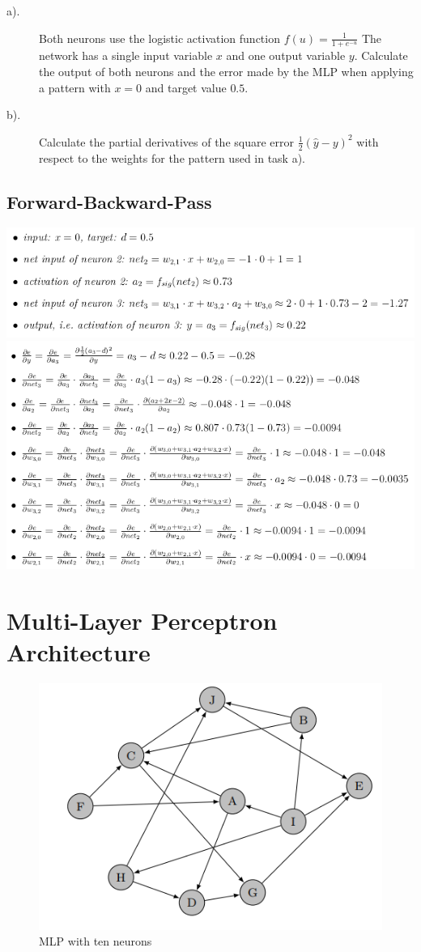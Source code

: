 \documentclass[12pt]{article}
\begin{document}
\begin{description}
	\item[a).]	Both neurons use the logistic activation function
	      $f(u)=\frac{1}{1+e^{-u}}$
	      The network has
	      a single input variable $x$ and one output variable $y$. Calculate the output of both
	      neurons and the error made by the MLP when applying a pattern with $x = 0$ and
	      target value $0.5$.
	\item[b).] Calculate the partial derivatives of the
	      square error $\frac{1}{2}(\hat{y} -y)^2$
	      with respect to the weights for the pattern used in task a).
\end{description}

\subsection{Forward-Backward-Pass}

{
	\centering
	\includegraphics[width=.9\textwidth]{fig/2018-04-02-14-48-39.png} \\
	\includegraphics[width=.9\textwidth]{fig/2018-04-02-14-49-31.png}
}

\newpage 
\section{Multi-Layer Perceptron Architecture}

\begin{figure}[!htbp]
	\centering
	\includegraphics[width=.55\textwidth]{fig/2018-03-19-13-54-31.png}
	\caption{MLP with ten neurons} \label{fig:mlp2}
\end{figure}
\end{document}
